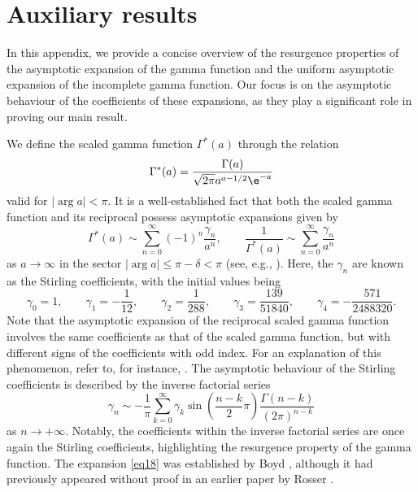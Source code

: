 \appendix

\section{Auxiliary results}\label{appendixa}

In this appendix, we provide a concise overview of the resurgence properties of the asymptotic expansion of the gamma function and the uniform asymptotic expansion of the incomplete gamma function. Our focus is on the asymptotic behaviour of the coefficients of these expansions, as they play a significant role in proving our main result.

We define the scaled gamma function $\Gamma^\ast(a)$ through the relation
\begin{equation}\label{eq24}
\Gamma^\ast (a) = \frac{\Gamma (a)}{\sqrt {2\pi } a^{a - 1/2} \e^{ - a} }
\end{equation}
valid for $|\arg a|<\pi$. It is a well-established fact that both the scaled gamma function and its reciprocal possess asymptotic expansions given by
\begin{equation}\label{eq25}
\Gamma^\ast (a) \sim \sum_{n = 0}^\infty ( - 1)^n \frac{\gamma _n }{a^n } ,\qquad \frac{1}{\Gamma^\ast (a)} \sim \sum_{n = 0}^\infty \frac{\gamma _n }{a^n }
\end{equation}
as $a\to \infty$ in the sector $|\arg a| \le \pi-\delta<\pi$ (see, e.g., \cite[Section~3.6]{Temme1996}). Here, the $\gamma_n$ are known as the Stirling coefficients, with the initial values being
\[
\gamma _0 = 1,\qquad\gamma _1 = - \frac{1}{12},\qquad\gamma _2 = \frac{1}{288},\qquad\gamma _3 = \frac{139}{51840},\qquad\gamma _4 = - \frac{571}{2488320}.
\]
Note that the asymptotic expansion of the reciprocal scaled gamma function involves the same coefficients as that of the scaled gamma function, but with different signs of the coefficients with odd index. For an explanation of this phenomenon, refer to, for instance, \cite[p.~63]{Temme1996}. The asymptotic behaviour of the Stirling coefficients is described by the inverse factorial series
\begin{equation}\label{eq18}
\gamma _n \sim -\frac{1}{\pi}\sum_{k= 0}^{\infty} \gamma_k \sin\left( \frac{n -k}{2}\pi \right)\frac{\Gamma (n - k)}{(2\pi )^{n - k}}
\end{equation}
as $n\to+\infty$. Notably, the coefficients within the inverse factorial series are once again the Stirling coefficients, highlighting the resurgence property of the gamma function. The expansion \eqref{eq18} was established by Boyd \cite[equation~(3.34)]{Boyd1994}, although it had previously appeared without proof in an earlier paper by Rosser \cite[equation~(97)]{Rosser1955}.

